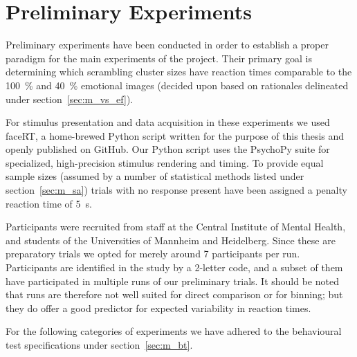     \section{Preliminary Experiments}\label{sec:m_pe}
	Preliminary experiments have been conducted in order to establish a proper paradigm for the main experiments of the project. 
	Their primary goal is determining which scrambling cluster sizes have reaction times comparable to the \SI{100}{\percent} and \SI{40}{\percent} emotional images (decided upon based on rationales delineated under section~\ref{sec:m_vs_ef}).
	
	For stimulus presentation and data acquisition in these experiments we used faceRT\cite{faceRT}, a home-brewed Python script written for the purpose of this thesis and openly published on GitHub.
	Our Python script uses the PsychoPy suite\cite{Peirce2008} for specialized, high-precision stimulus rendering and timing.
	To provide equal sample sizes (assumed by a number of statistical methods listed under section~\ref{sec:m_sa}) trials with no response present have been assigned a penalty reaction time of \SI{5}{\second}.
	
	Participants were recruited from staff at the Central Institute of Mental Health, and students of the Universities of Mannheim and Heidelberg.
	Since these are preparatory trials we opted for merely around 7 participants per run.
	Participants are identified in the study by a 2-letter code, and a subset of them have participated in multiple runs of our preliminary trials.
	It should be noted that runs are therefore not well suited for direct comparison or for binning; but they do offer a good predictor for expected variability in reaction times.
	
	For the following categories of experiments we have adhered to the behavioural test specifications under section~\ref{sec:m_bt}.  
